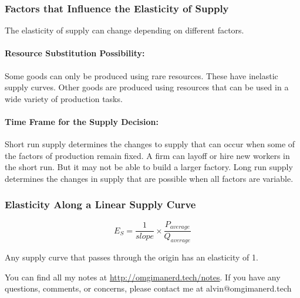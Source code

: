 \documentclass{article}
\begin{document}
\subsubsection{Factors that Influence the Elasticity of Supply}
The elasticity of supply can change depending on different factors.

\paragraph{Resource Substitution Possibility:}
Some goods can only be produced using rare resources. These have inelastic
supply curves. Other goods are produced using resources that can be used in
a wide variety of production tasks.

\paragraph{Time Frame for the Supply Decision:}
Short run supply determines the changes to supply that can occur when some of
the factors of production remain fixed. A firm can layoff or hire new workers
in the short run. But it may not be able to build a larger factory. Long run
supply determines the changes in supply that are possible when all factors are
variable.

\subsubsection{Elasticity Along a Linear Supply Curve}
\[ E_{S} = \frac{1}{slope}\times\frac{P_{average}}{Q_{average}} \]
\begin{center}
\end{center}
Any supply curve that passes through the origin has an elasticity of 1.

\begin{center}
  You can find all my notes at \url{http://omgimanerd.tech/notes}. If you have
  any questions, comments, or concerns, please contact me at
  alvin@omgimanerd.tech
\end{center}
\end{document}
